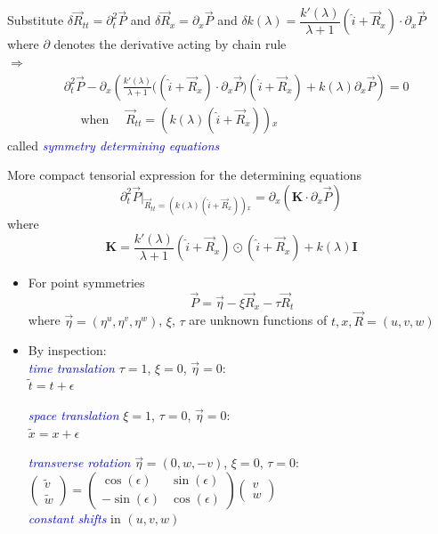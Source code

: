\documentclass[landscape]{slides}
\def\myemph#1{\textcolor{blue}{\em #1}}
\begin{document}
Substitute
$\delta \vec{R}_{tt} =\partial_t^2 \vec{P}$
and
$\delta \vec{R}_{x} =\partial_x \vec{P}$
and
$\delta k(\lambda) = \dfrac{k'(\lambda)}{\lambda +1} (\hat{i}+\vec{R}_x)\cdot \partial_x \vec{P}$
\\
where $\partial$ denotes the derivative acting by chain rule
\\
$\Longrightarrow$
\begin{align*}
& \partial_t^2 \vec{P} 
- \partial_x \left( 
\frac{k'(\lambda)}{\lambda + 1} \big( (\hat{i}+\vec{R}_x)\cdot \partial_x \vec{P} \big)(\hat{i}+\vec{R}_x)
+ k(\lambda) \partial_x \vec{P} \right)
=0
\\
&\quad\text{ when }\quad
\vec{R}_{tt} = ( k(\lambda) (\hat{i} + \vec{R}_x) ){}_x
\end{align*}
called \myemph{symmetry determining equations}

\newpage

More compact tensorial expression for the determining equations 
\[
\partial_t^2 \vec{P} \big|_{\vec{R}_{tt} = ( k(\lambda) (\hat{i} + \vec{R}_x) ){}_x}
= \partial_x \left( \mathbf{K} \cdot \partial_x \vec{P} \right)
\]
where
\[
\mathbf{K} = 
\frac{k'(\lambda)}{\lambda + 1} 
(\hat{i}+\vec{R}_x)\odot (\hat{i}+\vec{R}_x)
+ k(\lambda) \mathbf{I} 
\]
\hfil

\begin{itemize}
\item
For point symmetries
\[
\vec{P} = \vec{\eta} - \xi \vec{R}_x -\tau \vec{R}_t
\]
where $\vec{\eta}=(\eta^u,\eta^v,\eta^w)$, $\xi$, $\tau$ 
are unknown functions of $t,x,\vec{R}=(u,v,w)$
\item
By inspection:\\
\myemph{time translation} $\tau =1$, $\xi=0$, $\vec{\eta}=0$: \\
$\tilde{t}=t+\epsilon$

\myemph{space translation} $\xi =1$, $\tau=0$, $\vec{\eta}=0$: \\
$\tilde{x}=x+\epsilon$

\myemph{transverse rotation} $\vec{\eta} =(0,w, -v)$, $\xi =0$, $\tau=0$: \\
$\begin{pmatrix} \tilde{v} \\ \tilde{w} \end{pmatrix}
= \begin{pmatrix} 
\cos(\epsilon) & \sin(\epsilon) \\
-\sin(\epsilon) & \cos(\epsilon) 
\end{pmatrix}
\begin{pmatrix} v \\ w \end{pmatrix}$\\

\myemph{constant shifts} in $(u,v,w)$
\end{itemize}
\end{document}
